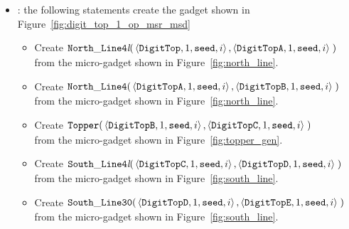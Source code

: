 \begin{itemize}
    \item {\dtop}: the following statements create the gadget shown in Figure~\ref{fig:digit_top_1_op_msr_msd}
    \begin{itemize}
        \item Create
        $\begin{aligned}[t]
            {\tt North\_Line4\textit{l}}(& \left\langle {\tt DigitTop},  1, {\tt seed}, i \right\rangle,
                                           \left\langle {\tt DigitTopA}, 1, {\tt seed}, i \right\rangle \;)
        \end{aligned}$\\from the micro-gadget shown in Figure~\ref{fig:north_line}.

        \item Create $\begin{aligned}[t]
            {\tt North\_Line4}(& \left\langle {\tt DigitTopA}, 1, {\tt seed}, i \right\rangle,
                                 \left\langle {\tt DigitTopB}, 1, {\tt seed}, i \right\rangle \;)
        \end{aligned}$\\from the micro-gadget shown in Figure~\ref{fig:north_line}.

        \item Create $\begin{aligned}[t]
            {\tt Topper}(& \left\langle {\tt DigitTopB}, 1, {\tt seed}, i \right\rangle,
                           \left\langle {\tt DigitTopC}, 1, {\tt seed}, i \right\rangle \;)
        \end{aligned}$\\from the micro-gadget shown in Figure~\ref{fig:topper_gen}.

        \item Create
        $\begin{aligned}[t]
            {\tt South\_Line4\textit{l}}(& \left\langle {\tt DigitTopC}, 1, {\tt seed}, i \right\rangle,
                                           \left\langle {\tt DigitTopD}, 1, {\tt seed}, i \right\rangle \;)
        \end{aligned}$\\from the micro-gadget shown in Figure~\ref{fig:south_line}.

        \item Create
        $\begin{aligned}[t]
            {\tt South\_Line30}(& \left\langle {\tt DigitTopD}, 1, {\tt seed}, i \right\rangle,
                                  \left\langle {\tt DigitTopE}, 1, {\tt seed}, i \right\rangle \;)
        \end{aligned}$\\from the micro-gadget shown in Figure~\ref{fig:south_line}.


\end{itemize}
\end{itemize}
